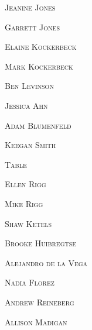 \documentclass[12pt]{article}
\begin{document}
\textsc{\Huge Jeanine Jones}

\vspace*{.15in}
\textsc{\Huge Garrett Jones}

\vspace*{.15in}
\textsc{\Huge Elaine Kockerbeck}

\vspace*{.15in}
\textsc{\Huge Mark Kockerbeck}

\vspace*{.15in}
\textsc{\Huge Ben Levinson}

\vspace*{.15in}
\textsc{\Huge Jessica Ahn}

\vspace*{.15in}
\textsc{\Huge Adam Blumenfeld}

\vspace*{.15in}
\textsc{\Huge Keegan Smith}

\vspace*{\fill}

\newpage

\vspace*{.25in}

\textsc{\Huge Table}
\vspace*{.3in}


\vspace*{\fill}

\textsc{\Huge Ellen Rigg}

\vspace*{.15in}
\textsc{\Huge Mike Rigg}

\vspace*{.15in}
\textsc{\Huge Shaw Ketels}

\vspace*{.15in}
\textsc{\Huge Brooke Huibregtse}

\vspace*{.15in}
\textsc{\Huge Alejandro de la Vega}

\vspace*{.15in}
\textsc{\Huge Nadia Florez}

\vspace*{.15in}
\textsc{\Huge Andrew Reineberg}

\vspace*{.15in}
\textsc{\Huge Allison Madigan}

\end{document}
